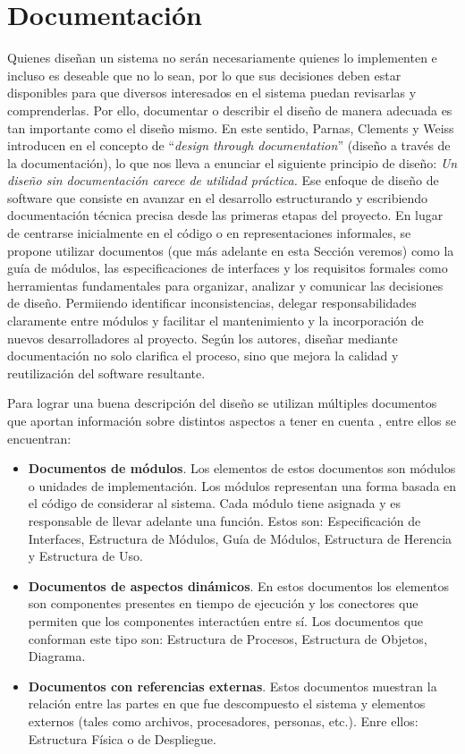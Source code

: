 \section{Documentación}
\label{secDocumentacion}

Quienes diseñan un sistema no serán necesariamente quienes lo implementen e incluso es deseable que no lo sean, por lo que sus decisiones deben estar disponibles para que diversos interesados en el sistema puedan revisarlas y comprenderlas. Por ello, documentar o describir el diseño de manera adecuada es tan importante como el diseño mismo. En este sentido, Parnas, Clements y Weiss introducen en el concepto de ``\textit{design through documentation}'' (diseño a través de la documentación), lo que nos lleva a enunciar el siguiente principio de diseño: \textit{Un diseño sin documentación carece de utilidad práctica.} Ese enfoque de diseño de software que consiste en avanzar en el desarrollo estructurando y escribiendo documentación técnica precisa desde las primeras etapas del proyecto. En lugar de centrarse inicialmente en el código o en representaciones informales, se propone utilizar documentos (que más adelante en esta Sección veremos) como la guía de módulos, las especificaciones de interfaces y los requisitos formales como herramientas fundamentales para organizar, analizar y comunicar las decisiones de diseño. Permiiendo identificar inconsistencias, delegar responsabilidades claramente entre módulos y facilitar el mantenimiento y la incorporación de nuevos desarrolladores al proyecto. Según los autores, diseñar mediante documentación no solo clarifica el proceso, sino que mejora la calidad y reutilización del software resultante.

Para lograr una buena descripción del diseño se utilizan múltiples documentos que aportan información sobre distintos aspectos a tener en cuenta \cite{ClementsEtAl2010}, entre ellos se encuentran:

\begin{itemize}
\item \textbf{Documentos de módulos}. Los elementos de estos documentos son módulos o unidades de implementación. Los módulos representan una forma basada en el código de considerar al sistema. Cada módulo tiene asignada y es responsable de llevar adelante una función. Estos son: Especificación de Interfaces, Estructura de Módulos, Guía de Módulos, Estructura de Herencia y Estructura de Uso.
\item \textbf{Documentos de aspectos dinámicos}. En estos documentos los elementos son componentes presentes en tiempo de ejecución y los conectores que permiten que los componentes interactúen entre sí. Los documentos que conforman este tipo son: Estructura de Procesos, Estructura de Objetos, Diagrama.
\item \textbf{Documentos con referencias externas}. Estos documentos muestran la relación entre las partes en que fue descompuesto el sistema y elementos externos (tales como archivos, procesadores, personas, etc.). Enre ellos: Estructura Física o de Despliegue.
\end{itemize}

